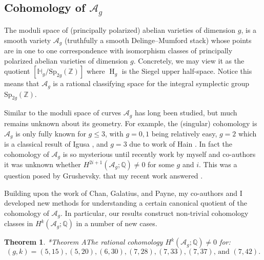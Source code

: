 \documentclass[11pt,reqno]{amsart}
\newtheorem{theorem}[lemma]{Theorem}
\theoremstyle{remark}
\renewcommand{\H}{\operatorname{H}}
\newcommand{\cA}{\mathcal{A}}
\newcommand{\cM}{\mathcal{M}}
\newcommand{\Q}{\mathbb{Q}}
\newcommand{\Z}{\mathbb{Z}}
\begin{document}





\subsection{Cohomology of $\cA_{g}$}

The moduli space of (principally polarized) abelian varieties of dimension $g$, is a smooth variety $\cA_{g}$ (truthfully a smooth Delinge--Mumford stack) whose points are in one to one correspondence with isomorphism classes of principally polarized abelian varieties of dimension $g$. Concretely, we may view it as the quotient $[\mathbb{H}_g/\mathrm{Sp}_{2g}(\Z)]$ where $\H_{g}$ is the Siegel upper half-space. Notice this means that $\cA_{g}$  is a rational classifying space for the integral symplectic group $\mathrm{Sp}_{2g}(\Z)$. 

Similar to the moduli space of curves $\cA_{g}$ has long been studied, but much remains unknown about its geometry. For example, the (singular) cohomology is $\cA_{g}$ is only fully known for $g\leq 3$, with $g=0,1$ being relatively easy, $g=2$ which is a classical result of Igusa \cite{igusa62}, and $g=3$ due to work of Hain \cite{hain02}. In fact the cohomology of $\cA_{g}$ is so mysterious until recently work by myself and co-authors it was unknown whether $H^{2i+1}(\cA_{g};\Q)\neq0$ for some $g$ and $i$. This was a question posed by Grushevsky. that my recent work answered \cite{grushevsky09}. 

Building upon the work of Chan, Galatius, and Payne, my co-authors and I developed new methods for understanding a certain canonical quotient of the cohomology of $\cA_{g}$. In particular, our results construct non-trivial cohomology classes in $H^{k}(\cA_{g}; \Q)$ in a number of new cases. 

\begin{theorem}\cite{BBCMMW22}*{Theorem A}\label{thm:Ag}
The rational cohomology $H^{k}\left(\cA_{g};\Q\right)\neq0$ for:
\[
\text{$(g,k)=(5,15),(5,20),(6,30),(7,28),(7,33),(7,37)$, and $(7,42)$}.
\]
\end{theorem}
\end{document}
